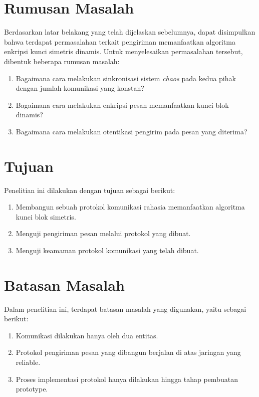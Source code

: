 \section{Rumusan Masalah}
Berdasarkan latar belakang yang telah dijelaskan sebelumnya, dapat disimpulkan bahwa terdapat permasalahan terkait pengiriman memanfaatkan algoritma enkripsi kunci simetris dinamis. Untuk menyelesaikan permasalahan tersebut, dibentuk beberapa rumusan masalah:
\begin{enumerate}
  \item Bagaimana cara melakukan sinkronisasi sistem \emph{chaos} pada kedua pihak dengan jumlah komunikasi yang konstan?
  \item Bagaimana cara melakukan enkripsi pesan memanfaatkan kunci blok dinamis?
  \item Bagaimana cara melakukan otentikasi pengirim pada pesan yang diterima?
\end{enumerate}

\section{Tujuan}
Penelitian ini dilakukan dengan tujuan sebagai berikut:

\begin{enumerate}
  \item Membangun sebuah protokol komunikasi rahasia memanfaatkan algoritma kunci blok simetris.
  \item Menguji pengiriman pesan melalui protokol yang dibuat.
  \item Menguji keamaman protokol komunikasi yang telah dibuat.
\end{enumerate}

\section{Batasan Masalah}
Dalam penelitian ini, terdapat batasan masalah yang digunakan, yaitu sebagai berikut:
\begin{enumerate}
  \item Komunikasi dilakukan hanya oleh dua entitas.
  \item Protokol pengiriman pesan yang dibangun berjalan di atas jaringan yang reliable.
  \item Proses implementasi protokol hanya dilakukan hingga tahap pembuatan prototype.
\end{enumerate}

